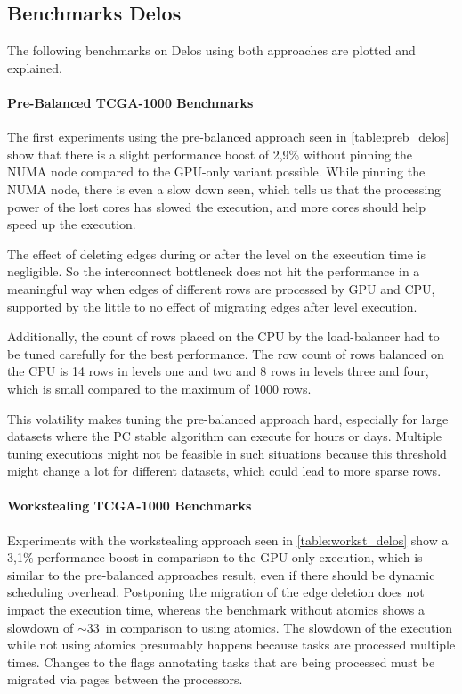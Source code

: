 \subsection{Benchmarks Delos}
The following benchmarks on Delos using both approaches are plotted and explained.

\paragraph{Pre-Balanced TCGA-1000 Benchmarks}

The first experiments using the pre-balanced approach seen in \ref{table:preb_delos} show that there is a slight performance boost of 2,9\% without pinning the NUMA node compared to the GPU-only variant possible. While pinning the NUMA node, there is even a slow down seen, which tells us that the processing power of the lost cores has slowed the execution, and more cores should help speed up the execution. 

The effect of deleting edges during or after the level on the execution time is negligible. So the interconnect bottleneck does not hit the performance in a meaningful way when edges of different rows are processed by GPU and CPU, supported by the little to no effect of migrating edges after level execution. 

Additionally, the count of rows placed on the CPU by the load-balancer had to be tuned carefully for the best performance. The row count of rows balanced on the CPU is 14 rows in levels one and two and 8 rows in levels three and four, which is small compared to the maximum of 1000 rows.

This volatility makes tuning the pre-balanced approach hard, especially for large datasets where the PC stable algorithm can execute for hours or days. Multiple tuning executions might not be feasible in such situations because this threshold might change a lot for different datasets, which could lead to more sparse rows.

\paragraph{Workstealing TCGA-1000 Benchmarks}

Experiments with the workstealing approach seen in \ref{table:workst_delos} show a 3,1\% performance boost in comparison to the GPU-only execution, which is similar to the pre-balanced approaches result, even if there should be dynamic scheduling overhead. Postponing the migration of the edge deletion does not impact the execution time, whereas the benchmark without atomics shows a slowdown of $\sim$33\ in comparison to using atomics. The slowdown of the execution while not using atomics presumably happens because tasks are processed multiple times. Changes to the flags annotating tasks that are being processed must be migrated via pages between the processors.


